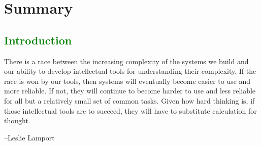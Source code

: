 \documentclass[12pt,initial,twoside,maitrise]{dms}
\newcommand{\mediumwell}[1]{\textcolor{green}{#1}}
\numberwithin{equation}{section}
\numberwithin{table}{chapter}
\numberwithin{figure}{chapter}
\begin{document}

\chapter*{Summary}


\anglais
\cleardoublepage
{}  %
\tableofcontents
\cleardoublepage
{}  %
\listoftables
\cleardoublepage
{}
\listoffigures

\NoChapterPageNumber
\cleardoublepage
{}

\mediumwell{\chapter{Introduction}\label{ch:introduction}}

\setlength{\epigraphwidth}{0.85\textwidth}
\epigraph{There is a race between the increasing complexity of the systems we build and our ability to develop intellectual tools for understanding their complexity. If the race is won by our tools, then systems will eventually become easier to use and more reliable. If not, they will continue to become harder to use and less reliable for all but a relatively small set of common tasks. Given how hard thinking is, if those intellectual tools are to succeed, they will have to substitute calculation for thought.}{\begin{flushright}--Leslie Lamport\end{flushright}}
\end{document}
